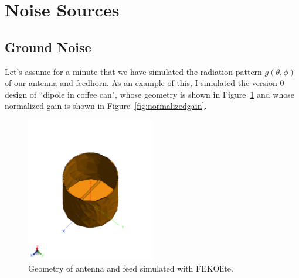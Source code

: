 \documentclass[11pt]{amsart}
\begin{document}


\section{Noise Sources}
\subsection{Ground Noise}
Let's assume for a minute that we have simulated the radiation pattern $g(\theta, \phi)$ of our antenna and feedhorn. As an example of this, I simulated the version 0 design of ``dipole in coffee can", whose geometry is shown in Figure~\ref{fig:cangeometry} and whose normalized gain is shown in Figure~\ref{fig:normalizedgain}.

\begin{figure}
\begin{center}
\includegraphics[width=0.5\textwidth]{figures/feedgeometry.png}
\end{center}
\caption{Geometry of antenna and feed simulated with FEKOlite.\label{fig:cangeometry}}
\end{figure}
\end{document}
